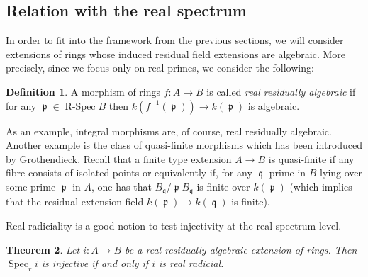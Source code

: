\documentclass[12pt]{amsart}
\newtheorem{thm}{Theorem}[section]
\theoremstyle{definition}
\newtheorem{defn}[thm]{Definition}
\DeclareMathOperator{\RSp}{R-Spec}
\DeclareMathOperator{\Sp}{Spec}
\DeclareMathOperator{\p}{\mathfrak{p}}
\DeclareMathOperator{\q}{{\mathfrak q}}
\begin{document}


\subsection{Relation with the real spectrum}
In order to fit into the framework from the previous sections, we will consider extensions of rings whose induced residual field extensions are algebraic. More precisely, since we focus only on real primes, we consider the following:

\begin{defn}
A morphism of rings $f:A\to B$ is called \textit{real residually algebraic} if for any $\p\in \RSp B$ then $k(f^{-1}(\p))\to k(\p)$ is algebraic.
\end{defn}

As an example, integral morphisms are, of course, real residually algebraic. Another example is the class of quasi-finite morphisms which has been introduced by Grothendieck. Recall that a finite type extension $A\to B$ is  quasi-finite if any fibre consists of isolated points or equivalently if, for any $\q$ prime in $B$ lying over some prime $\p$ in $A$, one has that $B_{\q}/{\p}B_{\q}$ is finite over $k(\p)$ (which implies that the residual extension field $k(\p)\to k(\q)$ is finite).


Real radiciality is a good notion to test injectivity at the real spectrum level.

\begin{thm}\label{prop3}
Let $i:A\to B$ be a real residually algebraic extension of rings. Then  $\Sp_r i$ is injective if and only if $i$ is  real radicial.
\end{thm}
\end{document}
